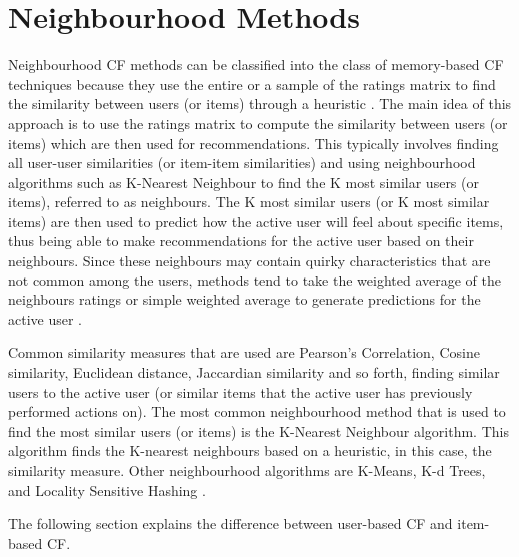 \section{Neighbourhood Methods}

Neighbourhood CF methods can be classified into the class of memory-based CF techniques because they use the entire or a sample of the ratings matrix to find the similarity between users (or items) through a heuristic \cite{memorybased, schafer2007collaborative}. The main idea of this approach is to use the ratings matrix to compute the similarity between users (or items) which are then used for recommendations. This typically involves finding all user-user similarities (or item-item similarities) and using neighbourhood algorithms such as K-Nearest Neighbour to find the K most similar users (or items), referred to as neighbours. The K most similar users (or K most similar items) are then used to predict how the active user will feel about specific items, thus being able to make recommendations for the active user based on their neighbours. Since these neighbours may contain quirky characteristics that are not common among the users, methods tend to take the weighted average of the neighbours ratings or simple weighted average to generate predictions for the active user \cite{survey}. 

Common similarity measures that are used are Pearson's Correlation, Cosine similarity, Euclidean distance, Jaccardian similarity and so forth, finding similar users to the active user (or similar items that the active user has previously performed actions on). The most common neighbourhood method that is used to find the most similar users (or items) is the K-Nearest Neighbour algorithm. This algorithm finds the K-nearest neighbours based on a heuristic, in this case, the similarity measure. Other neighbourhood algorithms are K-Means, K-d Trees, and Locality Sensitive Hashing \cite{survey}. 


The following section explains the difference between user-based CF and item-based CF.




